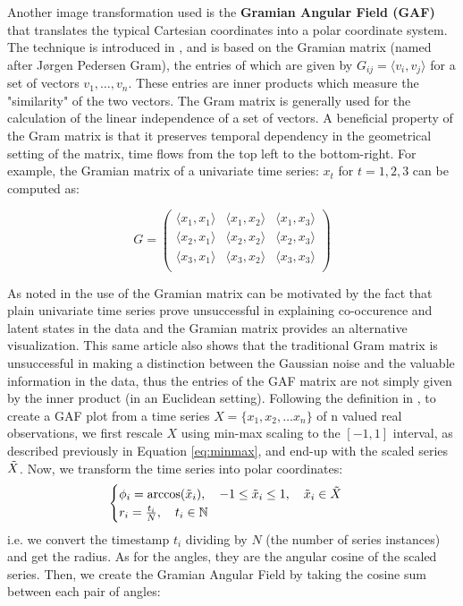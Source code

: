 \documentclass[11pt, a4paper]{article}
\begin{document}

Another image transformation used is the \textbf{Gramian Angular Field (GAF)} that translates the typical Cartesian coordinates into a polar coordinate system. The technique is introduced in \cite{wang2015encoding}, and is based on the Gramian matrix (named after J{\o}rgen Pedersen Gram), the entries of which are given by $G_{ij} = \langle v_i,v_j \rangle$ for a set of vectors $v_1,\dots, v_n$. These entries are inner products which measure the "similarity" of the two vectors. The Gram matrix is generally used for the calculation of the linear independence of a set of vectors. A beneficial property of the Gram matrix is that it preserves temporal dependency in the geometrical setting of the matrix, time flows from the top left to the bottom-right. For example, the Gramian matrix of a univariate time series: $x_t$ for $t=1, 2, 3$ can be computed as:

$$
G =\begin{pmatrix} 
\langle x_1,x_1 \rangle & \langle x_1,x_2 \rangle & \langle x_1,x_3 \rangle \\
\langle x_2,x_1 \rangle & \langle x_2,x_2 \rangle & \langle x_2,x_3 \rangle \\
\langle x_3,x_1 \rangle & \langle x_3,x_2 \rangle & \langle x_3,x_3 \rangle \\
\end{pmatrix}
$$

As noted in \cite{gaf_medium} the use of the Gramian matrix can be motivated by the fact that plain univariate time series prove unsuccessful in explaining co-occurence and latent states in the data and the Gramian matrix provides an alternative visualization. This same article also shows that the traditional Gram matrix is unsuccessful in making a distinction between the Gaussian noise and the valuable information in the data, thus the entries of the GAF matrix are not simply given by the inner product (in an Euclidean setting). Following the definition in \cite{wang2015encoding}, to create a GAF plot from a time series $X = \{x_1,x_2, \dots x_n\}$ of n valued real observations, we first rescale $X$ using min-max scaling to the $[-1,1]$ interval, as described previously in Equation \ref{eq:minmax}, and end-up with the scaled series $\Tilde{X}$. Now, we transform the time series into polar coordinates:
\begin{align}
\label{eq:gafencode}
    \begin{cases}
        \phi_i = \arccos(\Tilde{x}_i), \quad -1 \leq \Tilde{x}_i \leq 1, \quad \Tilde{x}_i \in \Tilde{X}\\
        r_i = \frac{t_i}{N}, \quad t_i \in \mathbb{N}
    \end{cases}
\end{align}
i.e. we convert the timestamp $t_i$ dividing by $N$ (the number of series instances) and get the radius. As for the angles, they are the angular cosine of the scaled series. Then, we create the Gramian Angular Field by taking the cosine sum between each pair of angles:
\end{document}
